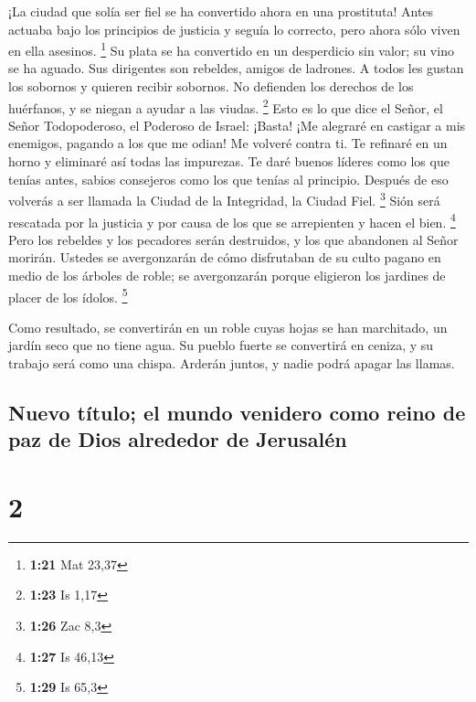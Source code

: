  ¡La ciudad que solía ser fiel se ha convertido ahora en
una prostituta! Antes actuaba bajo los principios de justicia y seguía
lo correcto, pero ahora sólo viven en ella asesinos. \footnote{\textbf{1:21}
  Mat 23,37}  Su plata se ha convertido en un desperdicio
sin valor; su vino se ha aguado.  Sus dirigentes son
rebeldes, amigos de ladrones. A todos les gustan los sobornos y quieren
recibir sobornos. No defienden los derechos de los huérfanos, y se
niegan a ayudar a las viudas. \footnote{\textbf{1:23} Is 1,17}
 Esto es lo que dice el Señor, el Señor Todopoderoso, el
Poderoso de Israel: ¡Basta! ¡Me alegraré en castigar a mis enemigos,
pagando a los que me odian!  Me volveré contra ti. Te
refinaré en un horno y eliminaré así todas las impurezas.
 Te daré buenos líderes como los que tenías antes, sabios
consejeros como los que tenías al principio. Después de eso volverás a
ser llamada la Ciudad de la Integridad, la Ciudad Fiel. \footnote{\textbf{1:26}
  Zac 8,3}  Sión será rescatada por la justicia y por
causa de los que se arrepienten y hacen el bien. \footnote{\textbf{1:27}
  Is 46,13}  Pero los rebeldes y los pecadores serán
destruidos, y los que abandonen al Señor morirán. 
Ustedes se avergonzarán de cómo disfrutaban de su culto pagano en medio
de los árboles de roble; se avergonzarán porque eligieron los jardines
de placer de los ídolos. \footnote{\textbf{1:29} Is 65,3}

 Como resultado, se convertirán en un roble cuyas hojas
se han marchitado, un jardín seco que no tiene agua.  Su
pueblo fuerte se convertirá en ceniza, y su trabajo será como una
chispa. Arderán juntos, y nadie podrá apagar las llamas.

\hypertarget{nuevo-tuxedtulo-el-mundo-venidero-como-reino-de-paz-de-dios-alrededor-de-jerusaluxe9n}{%
\subsection{Nuevo título; el mundo venidero como reino de paz de Dios
alrededor de
Jerusalén}\label{nuevo-tuxedtulo-el-mundo-venidero-como-reino-de-paz-de-dios-alrededor-de-jerusaluxe9n}}

\hypertarget{section-1}{%
\section{2}\label{section-1}}

